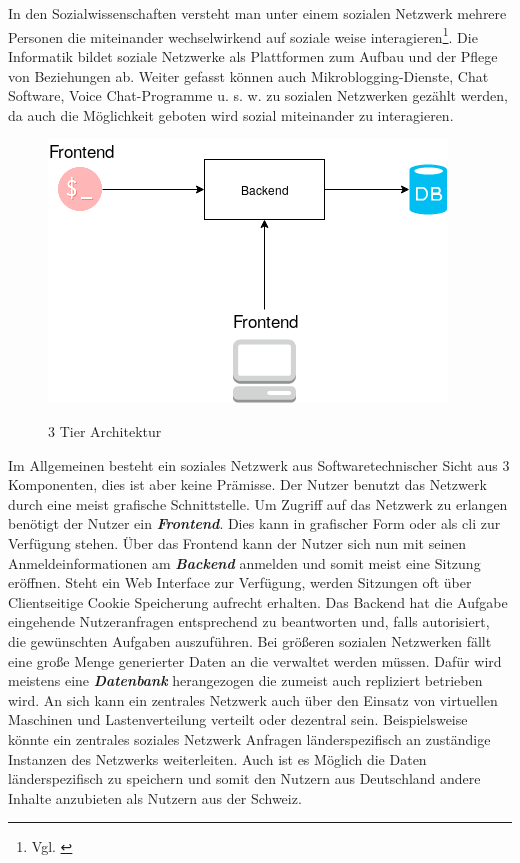\section{
}
	In den Sozialwissenschaften versteht man unter einem sozialen Netzwerk mehrere Personen die miteinander wechselwirkend auf soziale weise interagieren\footnote{Vgl. \cite{wikipedia-social-network-sociology}}. Die Informatik bildet soziale Netzwerke als Plattformen zum Aufbau und der Pflege von Beziehungen ab. Weiter gefasst können auch Mikroblogging-Dienste, Chat Software, Voice Chat-Programme u. s. w. zu sozialen Netzwerken gezählt werden, da auch die Möglichkeit geboten wird sozial miteinander zu interagieren.
	\begin{figure}[h]
		\begin{minipage}{\textwidth}
			\centering
			\includegraphics[scale=0.55]{figures/central-social-network.png}
			\label{fig:central-social-network}
			\caption{3 Tier Architektur}
		\end{minipage}
	\end{figure}
	Im Allgemeinen besteht ein soziales Netzwerk aus Softwaretechnischer Sicht aus 3 Komponenten, dies ist aber keine Prämisse. Der Nutzer benutzt das Netzwerk durch eine meist grafische Schnittstelle. Um Zugriff auf das Netzwerk zu erlangen benötigt der Nutzer ein \textit{\textbf{Frontend}}. Dies kann in grafischer Form oder als \gls{cli} zur Verfügung stehen. Über das Frontend kann der Nutzer sich nun mit seinen Anmeldeinformationen am \textit{\textbf{Backend}} anmelden und somit meist eine Sitzung eröffnen. Steht ein Web Interface zur Verfügung, werden Sitzungen oft über Clientseitige Cookie Speicherung aufrecht erhalten. Das Backend hat die Aufgabe eingehende Nutzeranfragen entsprechend zu beantworten und, falls autorisiert, die gewünschten Aufgaben auszuführen. Bei größeren sozialen Netzwerken fällt eine große Menge generierter Daten an die verwaltet werden müssen. Dafür wird meistens eine \textit{\textbf{Datenbank}} herangezogen die zumeist auch repliziert betrieben wird. An sich kann ein zentrales Netzwerk auch über den Einsatz von virtuellen Maschinen und Lastenverteilung verteilt oder dezentral sein. Beispielsweise könnte ein zentrales soziales Netzwerk Anfragen länderspezifisch an zuständige Instanzen des Netzwerks weiterleiten. Auch ist es Möglich die Daten länderspezifisch zu speichern und somit den Nutzern aus Deutschland andere Inhalte anzubieten als Nutzern aus der Schweiz.
